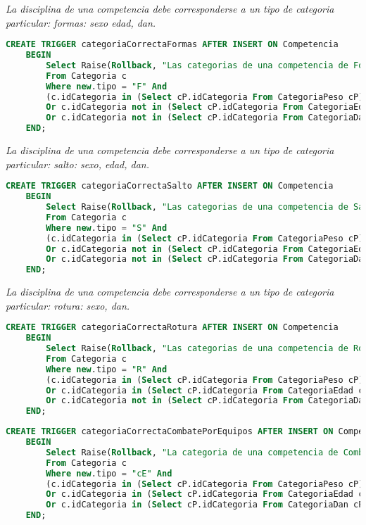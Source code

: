 \emph{
  La disciplina de una competencia debe corresponderse a un tipo de categoria particular: formas: sexo edad, dan.
}

\begin{lstlisting}[language=SQL]
CREATE TRIGGER categoriaCorrectaFormas AFTER INSERT ON Competencia
    BEGIN
        Select Raise(Rollback, "Las categorias de una competencia de Formas deben ser: Edad, Genero y Graduacion.")
        From Categoria c
        Where new.tipo = "F" And
        (c.idCategoria in (Select cP.idCategoria From CategoriaPeso cP)
        Or c.idCategoria not in (Select cP.idCategoria From CategoriaEdad cP)
        Or c.idCategoria not in (Select cP.idCategoria From CategoriaDan cP));
    END;
\end{lstlisting}
\emph{
  La disciplina de una competencia debe corresponderse a un tipo de categoria particular: salto: sexo, edad, dan.
}

\begin{lstlisting}[language=SQL]
CREATE TRIGGER categoriaCorrectaSalto AFTER INSERT ON Competencia
    BEGIN
        Select Raise(Rollback, "Las categorias de una competencia de Salto deben ser: Edad, Genero y Graduacion.")
        From Categoria c
        Where new.tipo = "S" And
        (c.idCategoria in (Select cP.idCategoria From CategoriaPeso cP)
        Or c.idCategoria not in (Select cP.idCategoria From CategoriaEdad cP)
        Or c.idCategoria not in (Select cP.idCategoria From CategoriaDan cP));
    END;

\end{lstlisting}
\emph{
  La disciplina de una competencia debe corresponderse a un tipo de categoria particular: rotura: sexo, dan.
}

\begin{lstlisting}[language=SQL]
CREATE TRIGGER categoriaCorrectaRotura AFTER INSERT ON Competencia
    BEGIN
        Select Raise(Rollback, "Las categorias de una competencia de Rotura deben ser: Genero y Graduacion.")
        From Categoria c
        Where new.tipo = "R" And
        (c.idCategoria in (Select cP.idCategoria From CategoriaPeso cP)
        Or c.idCategoria in (Select cP.idCategoria From CategoriaEdad cP)
        Or c.idCategoria not in (Select cP.idCategoria From CategoriaDan cP));
    END;

\end{lstlisting}
\emph{
}

\begin{lstlisting}[language=SQL]
CREATE TRIGGER categoriaCorrectaCombatePorEquipos AFTER INSERT ON Competencia
    BEGIN
        Select Raise(Rollback, "La categoria de una competencia de Combate por Equipos debe ser por Genero.")
        From Categoria c
        Where new.tipo = "cE" And
        (c.idCategoria in (Select cP.idCategoria From CategoriaPeso cP)
        Or c.idCategoria in (Select cP.idCategoria From CategoriaEdad cP)
        Or c.idCategoria in (Select cP.idCategoria From CategoriaDan cP));
    END;

\end{lstlisting}

